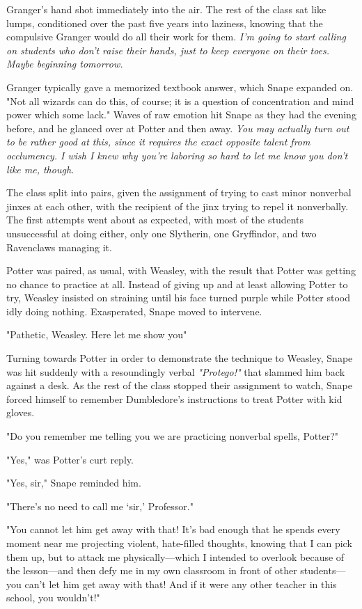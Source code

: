 Granger's hand shot immediately into the air. The rest of the class sat like lumps, conditioned over the past five years into laziness, knowing that the compulsive Granger would do all their work for them. \emph{I'm going to start calling on students who don't raise their hands, just to keep everyone on their toes. Maybe beginning tomorrow.}

Granger typically gave a memorized textbook answer, which Snape expanded on. "Not all wizards can do this, of course; it is a question of concentration and mind power which some lack." Waves of raw emotion hit Snape as they had the evening before, and he glanced over at Potter and then away. \emph{You may actually turn out to be rather good at this, since it requires the exact opposite talent from occlumency. I wish I knew why you're laboring so hard to let me know you don't like me, though.}

The class split into pairs, given the assignment of trying to cast minor nonverbal jinxes at each other, with the recipient of the jinx trying to repel it nonverbally. The first attempts went about as expected, with most of the students unsuccessful at doing either, only one Slytherin, one Gryffindor, and two Ravenclaws managing it.

Potter was paired, as usual, with Weasley, with the result that Potter was getting no chance to practice at all. Instead of giving up and at least allowing Potter to try, Weasley insisted on straining until his face turned purple while Potter stood idly doing nothing. Exasperated, Snape moved to intervene.

"Pathetic, Weasley. Here{\el} let me show you{\el}"

Turning towards Potter in order to demonstrate the technique to Weasley, Snape was hit suddenly with a resoundingly verbal \emph{"Protego!"} that slammed him back against a desk. As the rest of the class stopped their assignment to watch, Snape forced himself to remember Dumbledore's instructions to treat Potter with kid gloves.

"Do you remember me telling you we are practicing nonverbal spells, Potter?"

"Yes," was Potter's curt reply.

"Yes, sir," Snape reminded him.

"There's no need to call me `sir,' Professor."

\sbreak

"You cannot let him get away with that! It's bad enough that he spends every moment near me projecting violent, hate-filled thoughts, knowing that I can pick them up, but to attack me physically—which I intended to overlook because of the lesson—and then defy me in my own classroom in front of other students—you can't let him get away with that! And if it were any other teacher in this school, you wouldn't!"


